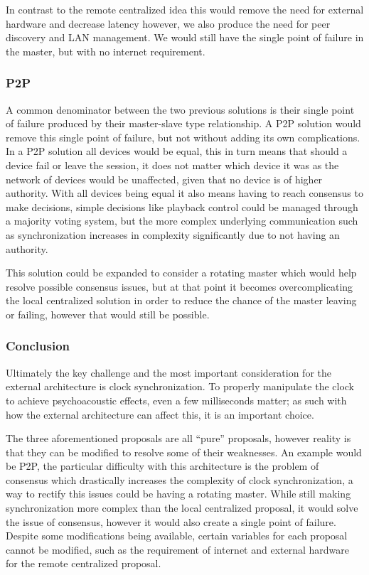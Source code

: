 In contrast to the remote centralized idea this would remove the need for external hardware and decrease latency however, we also produce the need for peer discovery and LAN management.
We would still have the single point of failure in the master, but with no internet requirement.

\subsubsection{\acl{P2P}}
A common denominator between the two previous solutions is their single point of failure produced by their master-slave type relationship.
A \ac{P2P} solution would remove this single point of failure, but not without adding its own complications.
In a \ac{P2P} solution all devices would be equal, this in turn means that should a device fail or leave the session, it does not matter which device it was as the network of devices would be unaffected, given that no device is of higher authority.
With all devices being equal it also means having to reach consensus to make decisions, simple decisions like playback control could be managed through a majority voting system, but the more complex underlying communication such as synchronization increases in complexity significantly due to not having an authority.

This solution could be expanded to consider a rotating master which would help resolve possible consensus issues, but at that point it becomes overcomplicating the local centralized solution in order to reduce the chance of the master leaving or failing, however that would still be possible.

\subsubsection{Conclusion}
Ultimately the key challenge and the most important consideration for the external architecture is clock synchronization.
To properly manipulate the clock to achieve psychoacoustic effects, even a few milliseconds matter; as such with how the external architecture can affect this, it is an important choice.

The three aforementioned proposals are all ``pure'' proposals, however reality is that they can be modified to resolve some of their weaknesses.
An example would be \ac{P2P}, the particular difficulty with this architecture is the problem of consensus which drastically increases the complexity of clock synchronization, a way to rectify this issues could be having a rotating master.
While still making synchronization more complex than the local centralized proposal, it would solve the issue of consensus, however it would also create a single point of failure.
Despite some modifications being available, certain variables for each proposal cannot be modified, such as the requirement of internet and external hardware for the remote centralized proposal.

